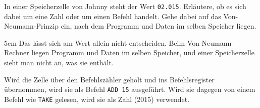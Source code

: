 \question[3]
In einer Speicherzelle von Johnny steht der Wert \texttt{02.015}.
Erläutere, ob es sich dabei um eine Zahl oder um einen Befehl handelt.
Gehe dabei auf das Von-Neumann-Prinzip ein, nach dem Programm und Daten im selben Speicher liegen.

\begin{solutionbox}{5cm}
Das lässt sich am Wert allein nicht entscheiden. Beim Von-Neumann-Rechner liegen
Programm und Daten im selben Speicher, und einer Speicherzelle sieht man nicht an,
was sie enthält.

Wird die Zelle über den Befehlszähler geholt und ins Befehlsregister übernommen,
wird sie als Befehl \texttt{ADD 15} ausgeführt. Wird sie dagegen von einem Befehl wie
\texttt{TAKE} gelesen, wird sie als Zahl (2015) verwendet.
\end{solutionbox}
